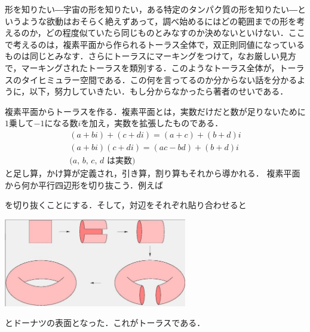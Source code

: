 


形を知りたい―宇宙の形を知りたい，ある特定のタンパク質の形を知りたい―というような欲動はおそらく絶えずあって，調べ始めるにはどの範囲までの形を考えるのか，どの程度似ていたら同じものとみなすのか決めないといけない．ここで考えるのは，複素平面から作られるトーラス全体で，双正則同値になっているものは同じとみなす．さらにトーラスにマーキングをつけて，なお厳しい見方で，マーキングされたトーラスを類別する．このようなトーラス全体が，トーラスのタイヒミュラー空間である．この何を言ってるのか分からない話を分かるように，以下，努力していきたい．もし分からなかったら著者のせいである．

複素平面からトーラスを作る．複素平面とは，実数だけだと数が足りないために$1$乗して$-1$になる数$i$を加え，実数を拡張したものである．
%
%
\begin{gather*}
(a+bi)+(c+di)=(a+c)+(b+d)i \\
(a+bi)(c+di)=(ac-bd)+(b+d)i \\
\text{($a$, $b$, $c$, $d$ は実数)}
\end{gather*}
と足し算，かけ算が定義され，引き算，割り算もそれから導かれる．
複素平面から何か平行四辺形を切り抜こう．例えば
\begin{center}
\end{center}
を切り抜くことにする．そして，対辺をそれぞれ貼り合わせると
\begin{center}
\includegraphics[width=8cm]{asaka3.png}
\end{center}
とドーナツの表面となった．これがトーラスである．

